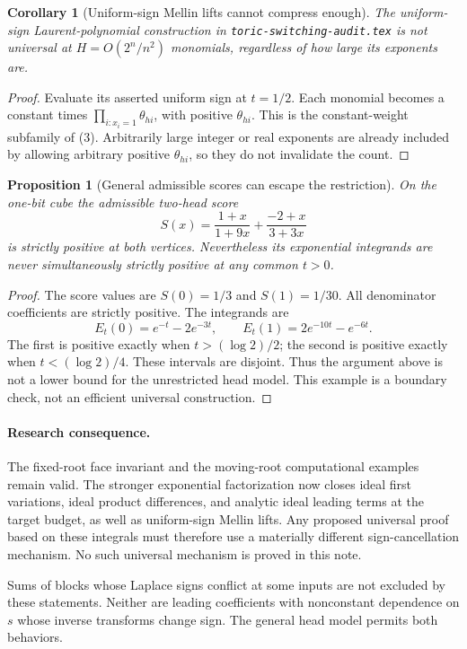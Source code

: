 \documentclass[11pt]{article}
\newtheorem{corollary}[theorem]{Corollary}
\newtheorem{proposition}[theorem]{Proposition}
\begin{document}
\begin{corollary}[Uniform-sign Mellin lifts cannot compress enough]
The uniform-sign Laurent-polynomial construction in
\texttt{toric-switching-audit.tex} is not universal at
$H=O(2^n/n^2)$ monomials, regardless of how large its exponents are.
\end{corollary}
\begin{proof}
Evaluate its asserted uniform sign at $t=1/2$.
Each monomial becomes a constant times
$\prod_{i:x_i=1}\theta_{hi}$, with positive $\theta_{hi}$.
This is the constant-weight subfamily of (3). Arbitrarily large
integer or real exponents are already included by allowing arbitrary
positive $\theta_{hi}$, so they do not invalidate the count.
\end{proof}

\begin{proposition}[General admissible scores can escape the restriction]
On the one-bit cube the admissible two-head score
\[
 S(x)=\frac{1+x}{1+9x}+\frac{-2+x}{3+3x}
\]
is strictly positive at both vertices. Nevertheless its exponential
integrands are never simultaneously strictly positive at any
common $t>0$.
\end{proposition}
\begin{proof}
The score values are $S(0)=1/3$ and $S(1)=1/30$.
All denominator coefficients are strictly positive. The integrands are
\[
 E_t(0)=e^{-t}-2e^{-3t},\qquad
 E_t(1)=2e^{-10t}-e^{-6t}.
\]
The first is positive exactly when $t>(\log 2)/2$; the second
is positive exactly when $t<(\log 2)/4$. These intervals are
disjoint. Thus the argument above is not a lower bound for the
unrestricted head model. This example is a boundary check, not an
efficient universal construction.
\end{proof}

\paragraph{Research consequence.}
The fixed-root face invariant and the moving-root computational
examples remain valid. The stronger exponential factorization now
closes ideal first variations, ideal product differences, and analytic
ideal leading terms at the target budget, as well as uniform-sign Mellin lifts.
Any proposed universal proof based on these integrals must therefore
use a materially different sign-cancellation mechanism. No such
universal mechanism is proved in this note.

Sums of blocks whose Laplace signs conflict at some inputs are not
excluded by these statements. Neither are leading coefficients with
nonconstant dependence on $s$ whose inverse transforms change sign.
The general head model permits both behaviors.
\end{document}

